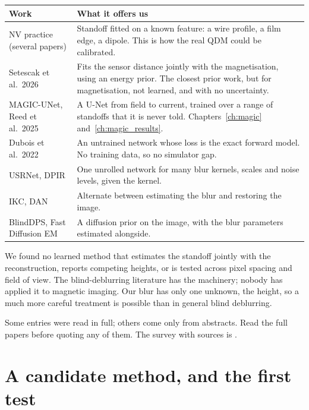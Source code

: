 \begin{center}
\small
\begin{tabularx}{\textwidth}{>{\raggedright\arraybackslash}p{4.2cm}X}
\toprule
Work & What it offers us \\
\midrule
NV practice (several papers) & Standoff fitted on a known feature: a wire profile, a film edge, a dipole. This is how
the real QDM could be calibrated. \\
Setescak et al.\ 2026 & Fits the sensor distance jointly with the magnetisation, using an energy prior. The closest prior
work, but for magnetisation, not learned, and with no uncertainty. \\
MAGIC-UNet, Reed et al.\ 2025 & A U-Net from field to current, trained over a range of standoffs that it is never told.
Chapters~\ref{ch:magic} and~\ref{ch:magic_results}. \\
Dubois et al.\ 2022 & An untrained network whose loss is the exact forward model. No training data, so no simulator gap. \\
USRNet, DPIR & One unrolled network for many blur kernels, scales and noise levels, given the kernel. \\
IKC, DAN & Alternate between estimating the blur and restoring the image. \\
BlindDPS, Fast Diffusion EM & A diffusion prior on the image, with the blur parameters estimated alongside. \\
\bottomrule
\end{tabularx}
\end{center}

\begin{keyidea}
We found no learned method that estimates the standoff jointly with the reconstruction, reports competing heights, or is
tested across pixel spacing and field of view. The blind-deblurring literature has the machinery; nobody has applied it to
magnetic imaging. Our blur has only one unknown, the height, so a much more careful treatment is possible than in general
blind deblurring.
\end{keyidea}

\begin{careful}
Some entries were read in full; others come only from abstracts. Read the full papers before quoting any of them. The
survey with sources is .
\end{careful}

\section{A candidate method, and the first test}


